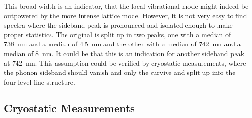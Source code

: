 		This broad width is an indicator, that the local vibrational mode might indeed be outpowered by the more intense lattice mode.
		However, it is not very easy to find spectra where the sideband peak is pronounced and isolated enough to make proper statistics.
		The original \ZPL is split up in two peaks, one with a median \cwl of \SI{738}{nm} and a median \lw of \SI{4.5}{nm} and the other with a median \cwl of \SI{742}{nm} and a median \lw of \SI{8}{nm}.
		It could be that this is an indication for another sideband peak at \SI{742}{nm}.
		This assumption could be verified by cryostatic measurements, where the phonon sideband should vanish and only the \ZPL survive and split up into the four-level fine structure.
		\\
		\begin{figure}[tp]
			\begin{subfigure}[t]{ 0.49\linewidth}
				\centering
				\caption{}
				\label{subfig::sb_multfit_pos}
			\end{subfigure}
			\hfill
			\begin{subfigure}[t]{ 0.49\linewidth}
				\centering
				\caption{}
				\label{subfig::sb_multfit_width}
			\end{subfigure}
			\caption{}
			\label{fig::sideband_multfit}
		\end{figure}


	\subsection{Cryostatic Measurements}\label{subsec::cryo}

		\begin{figure}[tp]
			\begin{subfigure}[t]{ 0.49\linewidth}
				\centering
				\caption{}
				\label{subfig::roomtep1}
			\end{subfigure}
			\hfill
			\begin{subfigure}[t]{ 0.49\linewidth}
				\centering
				\caption{}
				\label{subfig::cryo}
			\end{subfigure}
			\caption{}
			\label{fig::rt_vs_cryo1}
		\end{figure}

